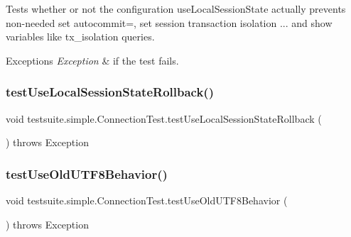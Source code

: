 Tests whether or not the configuration \textquotesingle{}use\+Local\+Session\+State\textquotesingle{} actually prevents non-\/needed \textquotesingle{}set autocommit=\textquotesingle{}, \textquotesingle{}set session transaction isolation ...\textquotesingle{} and \textquotesingle{}show variables like tx\+\_\+isolation\textquotesingle{} queries.


\begin{DoxyExceptions}{Exceptions}
{\em Exception} & if the test fails. \\
\hline
\end{DoxyExceptions}
\mbox{\label{classtestsuite_1_1simple_1_1_connection_test_afb4fb6217aa0ef099d610a92a8be2bfb}} 
\subsubsection{\texorpdfstring{test\+Use\+Local\+Session\+State\+Rollback()}{testUseLocalSessionStateRollback()}}
{\footnotesize\ttfamily void testsuite.\+simple.\+Connection\+Test.\+test\+Use\+Local\+Session\+State\+Rollback (\begin{DoxyParamCaption}{ }\end{DoxyParamCaption}) throws Exception}

\mbox{\label{classtestsuite_1_1simple_1_1_connection_test_a55c54f86b4450240678a5ed9eb986b8a}} 
\subsubsection{\texorpdfstring{test\+Use\+Old\+U\+T\+F8\+Behavior()}{testUseOldUTF8Behavior()}}
{\footnotesize\ttfamily void testsuite.\+simple.\+Connection\+Test.\+test\+Use\+Old\+U\+T\+F8\+Behavior (\begin{DoxyParamCaption}{ }\end{DoxyParamCaption}) throws Exception}

